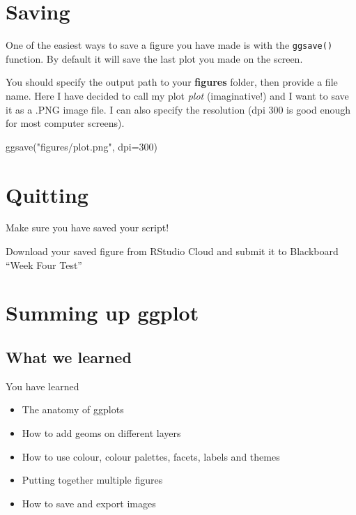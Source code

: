\documentclass[
]{book}
\makeatletter
\newenvironment{Shaded}{\begin{snugshade}}{\end{snugshade}}
\newcommand{\AttributeTok}[1]{\textcolor[rgb]{0.77,0.63,0.00}{#1}}
\newcommand{\DecValTok}[1]{\textcolor[rgb]{0.00,0.00,0.81}{#1}}
\newcommand{\FunctionTok}[1]{\textcolor[rgb]{0.00,0.00,0.00}{#1}}
\newcommand{\NormalTok}[1]{#1}
\newcommand{\StringTok}[1]{\textcolor[rgb]{0.31,0.60,0.02}{#1}}
\newenvironment{kframe}{%
\medskip{}
\setlength{\fboxsep}{.8em}
 \def\at@end@of@kframe{}%
 \ifinner\ifhmode%
  \def\at@end@of@kframe{\end{minipage}}%
  \begin{minipage}{\columnwidth}%
 \fi\fi%
 \def\FrameCommand##1{\hskip\@totalleftmargin \hskip-\fboxsep
 \colorbox{shadecolor}{##1}\hskip-\fboxsep
     \hskip-\linewidth \hskip-\@totalleftmargin \hskip\columnwidth}%
 \MakeFramed {\advance\hsize-\width
   \@totalleftmargin\z@ \linewidth\hsize
   \@setminipage}}%
 {\par\unskip\endMakeFramed%
 \at@end@of@kframe}
\newenvironment{block}[1]
  {
  \begin{itemize}
  \renewcommand{\labelitemi}{
    \raisebox{-.7\height}[0pt][0pt]{
      {\setkeys{Gin}{width=3em,keepaspectratio}\texttt{[image: images/\#1]}}
    }
  }
  \setlength{\fboxsep}{1em}
  \begin{kframe}
  \item
  }
  {
  \end{kframe}
  \end{itemize}
  }
\newenvironment{rmdquestion}
  {\begin{block}{question}}
  {\end{block}}
\newenvironment{rmdwarning}
  {\begin{block}{warning}}
  {\end{block}}
\makeatother
\begin{document}
\hypertarget{saving}{%
\section{Saving}\label{saving}}

One of the easiest ways to save a figure you have made is with the \texttt{ggsave()} function. By default it will save the last plot you made on the screen.

You should specify the output path to your \textbf{figures} folder, then provide a file name. Here I have decided to call my plot \emph{plot} (imaginative!) and I want to save it as a .PNG image file. I can also specify the resolution (dpi 300 is good enough for most computer screens).

\begin{Shaded}
\begin{Highlighting}[]
\FunctionTok{ggsave}\NormalTok{(}\StringTok{"figures/plot.png"}\NormalTok{, }\AttributeTok{dpi=}\DecValTok{300}\NormalTok{)}
\end{Highlighting}
\end{Shaded}

\hypertarget{quitting-3}{%
\section{Quitting}\label{quitting-3}}

\begin{rmdwarning}
Make sure you have saved your script!
\end{rmdwarning}

\begin{rmdquestion}
Download your saved figure from RStudio Cloud and submit it to
Blackboard ``Week Four Test''
\end{rmdquestion}

\hypertarget{summing-up-ggplot}{%
\section{Summing up ggplot}\label{summing-up-ggplot}}

\hypertarget{what-we-learned-1}{%
\subsection{What we learned}\label{what-we-learned-1}}

You have learned

\begin{itemize}
\item
  The anatomy of ggplots
\item
  How to add geoms on different layers
\item
  How to use colour, colour palettes, facets, labels and themes
\item
  Putting together multiple figures
\item
  How to save and export images
\end{itemize}
\end{document}
